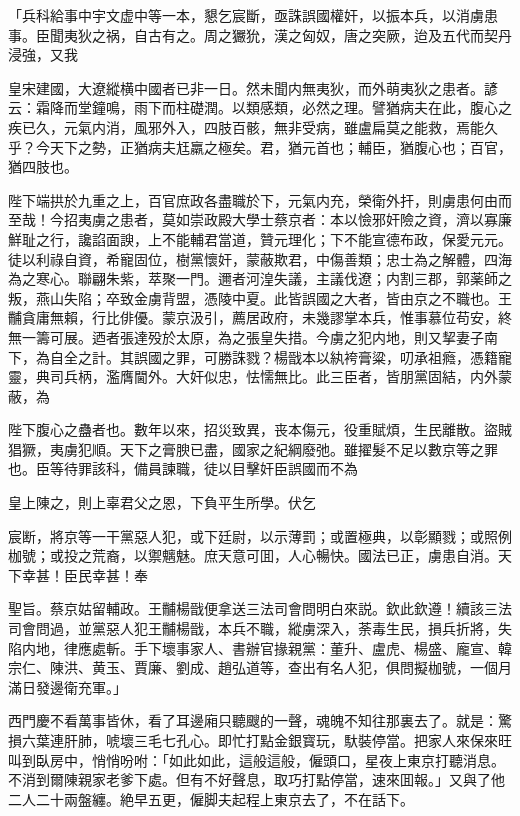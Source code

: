 \begin{myquote}[\markfont]
「兵科給事中宇文虚中等一本，懇乞宸斷，亟誅誤國權奸，以振本兵，以消虜患事。臣聞夷狄之祸，自古有之。周之玁狁，漢之匈奴，唐之突厥，迨及五代而契丹浸強，又我

皇宋建國，大遼縱横中國者已非一日。然未聞内無夷狄，而外萌夷狄之患者。諺云：霜降而堂鐘鳴，雨下而柱礎潤。以類感類，必然之理。譬猶病夫在此，腹心之疾已久，元氣内消，風邪外入，四肢百骸，無非受病，雖盧扁莫之能救，焉能久乎？今天下之勢，正猶病夫尪羸之極矣。君，猶元首也；輔臣，猶腹心也；百官，猶四肢也。

陛下端拱於九重之上，百官庶政各盡職於下，元氣内充，榮衛外扞，則虜患何由而至哉！今招夷虜之患者，莫如崇政殿大學士蔡京者：本以憸邪奸險之資，濟以寡廉鮮耻之行，讒諂面諛，上不能輔君當道，贊元理化；下不能宣德布政，保愛元元。徒以利祿自資，希寵固位，樹黨懷奸，蒙蔽欺君，中傷善類；忠士為之解體，四海為之寒心。聯翩朱紫，萃聚一門。邇者河湟失議，主議伐遼；内割三郡，郭薬師之叛，燕山失陷；卒致金虜背盟，憑陵中夏。此皆誤國之大者，皆由京之不職也。王黼貪庸無賴，行比俳優。蒙京汲引，薦居政府，未幾謬掌本兵，惟事慕位苟安，終無一籌可展。迺者張達殁於太原，為之張皇失措。今虜之犯内地，則又挈妻子南下，為自全之計。其誤國之罪，可勝誅戮？楊戩本以紈袴膏粱，叨承祖癊，憑籍寵靈，典司兵柄，濫膺閫外。大奸似忠，怯懦無比。此三臣者，皆朋黨固結，内外蒙蔽，為

陛下腹心之蠱者也。數年以來，招災致異，丧本傷元，役重賦煩，生民離散。盜賊猖獗，夷虜犯順。天下之膏腴已盡，國家之紀綱廢弛。雖擢髮不足以數京等之罪也。臣等待罪該科，備員諫職，徒以目擊奸臣誤國而不為

皇上陳之，則上辜君父之恩，下負平生所學。伏乞

宸断，將京等一干黨惡人犯，或下廷尉，以示薄罰；或置極典，以彰顯戮；或照例枷號；或投之荒裔，以禦魑魅。庶天意可囬，人心暢快。國法已正，虜患自消。天下幸甚！臣民幸甚！奉

聖旨。蔡京姑留輔政。王黼楊戩便拿送三法司會問明白來説。欽此欽遵！續該三法司會問過，並黨惡人犯王黼楊戩，本兵不職，縱虜深入，荼毒生民，損兵折將，失陷内地，律應處斬。手下壞事家人、書辦官掾親黨：董升、盧虎、楊盛、龐宣、韓宗仁、陳洪、黄玉、賈廉、劉成、趙弘道等，查出有名人犯，俱問擬枷號，一個月滿日發邊衛充軍。」
\end{myquote}

西門慶不看萬事皆休，看了耳邊廂只聽颼的一聲，魂魄不知往那裏去了。就是：驚損六葉連肝肺，唬壞三毛七孔心。即忙打點金銀寳玩，馱裝停當。把家人來保來旺叫到臥房中，悄悄吩咐：「如此如此，這般這般，僱頭口，星夜上東京打聽消息。不消到爾陳親家老爹下處。但有不好聲息，取巧打點停當，速來囬報。」又與了他二人二十兩盤纏。絶早五更，僱脚夫起程上東京去了，不在話下。

